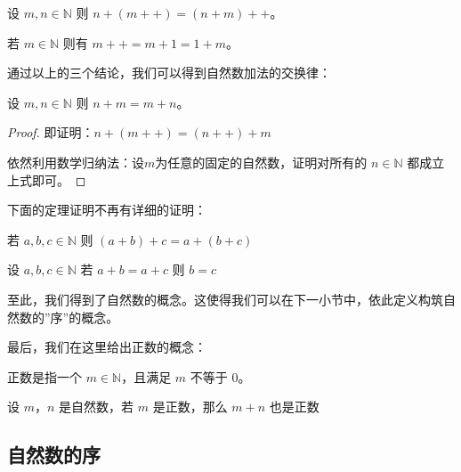 \begin{lemma}
	设 $m,n\in \mathbb N$ 则 $n+(m++)=(n+m)++$。
\end{lemma}


\begin{corollary}
	若 $m\in \mathbb N$ 则有 $m++=m+1=1+m$。
\end{corollary}

通过以上的三个结论，我们可以得到自然数加法的交换律：

\begin{theorem}[交换律]
	设 $m,n\in \mathbb N$ 则 $n+m=m+n$。
\end{theorem}

\begin{proof}
	即证明：$n+(m++)=(n++)+m$
	
	依然利用数学归纳法：设$m$为任意的固定的自然数，证明对所有的 $n\in \mathbb N$ 都成立上式即可。
\end{proof}

下面的定理证明不再有详细的证明：

\begin{theorem}[结合律]
	若 $a,b,c\in \mathbb N$ 则 $(a+b)+c = a+(b+c)$
\end{theorem}


\begin{theorem}[消去律]
	设 $a,b,c\in \mathbb N$ 若 $a+b=a+c$ 则 $b=c$
\end{theorem}

至此，我们得到了自然数的概念。这使得我们可以在下一小节中，依此定义构筑自然数的''序''的概念。

最后，我们在这里给出正数的概念：

\begin{definition}[正整数]
	正数是指一个 $m\in \mathbb N$，且满足 $m$ 不等于 $0$。
\end{definition}

\begin{theorem}
	设 $m$，$n$ 是自然数，若 $m$ 是正数，那么 $m+n$ 也是正数
\end{theorem}


\subsection{自然数的序}

